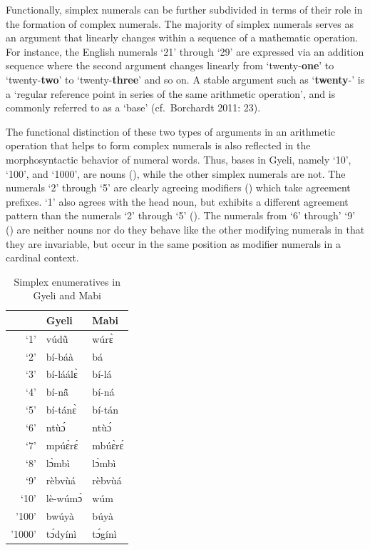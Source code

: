 Functionally, simplex numerals can be further subdivided  in terms of their role in the formation of complex numerals. The majority of simplex numerals serves as an argument that linearly changes within a sequence of a mathematic operation. For instance, the English numerals `21' through `29' are expressed via an addition sequence where the second argument changes linearly from `twenty-{\bfseries one}' to `twenty-{\bfseries two}' to `twenty-{\bfseries three}' and so on. A stable argument such as `{\bfseries twenty}-'  is a `regular reference point in series of the same arithmetic operation', and is commonly referred to as a `base' (cf.\ Borchardt 2011: 23).

The functional distinction of these two types of arguments in an arithmetic operation that helps to form complex numerals is also reflected in the morphosyntactic behavior of numeral words. Thus, bases in Gyeli, namely `10', `100', and `1000', are nouns (), while the other simplex numerals are not. The numerals  `2' through `5' are clearly agreeing modifiers () which take agreement prefixes. `1'  also agrees with the head noun, but exhibits a different agreement pattern than the numerals `2' through `5' (). The numerals from `6' through' `9'  () are neither nouns nor do they behave like the other modifying numerals in that they are invariable, but occur in the same position as modifier numerals in a cardinal context.


\begin{table} 
\centering
\begin{tabular}{r|p{3cm}|p{3cm}}
 \midrule
 & Gyeli & Mabi \\
  \midrule
 `1' & vúdũ̀ & wúrɛ̀ \\
 `2' & bí-báà & bá \\
 `3' & bí-láálɛ̀ & bí-lá\\
 `4' & bí-nã̂ & bí-ná\\
 `5' & bí-tánɛ̀ & bí-tán \\
 `6' & ntùɔ́ & ntùɔ́  \\
  `7' & mpúɛ̀rɛ́ & mbúɛ̀rɛ́ \\
 `8' & lɔ̀mbì & lɔ̀mbì \\
 `9' & rèbvùá & rèbvùá\\
 `10' & lè-wúmɔ̀ & wúm \\
'100' & bwúyà & búyà \\
'1000' & tɔ́dyínì & tɔ́gínì \\
  \midrule
\end{tabular}
\caption{Simplex enumeratives in Gyeli and Mabi}
\label{tab:Enum}
\end{table}

